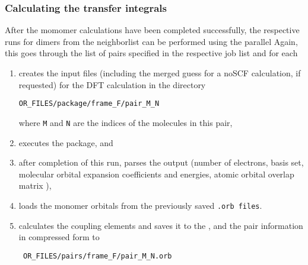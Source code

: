 \subsubsection{Calculating the transfer integrals}
After the momomer calculations have been completed successfully, the respective runs for dimers from the neighborlist can be performed using the parallel  \calculator
\label{sec:edft}
\vskip 0.1cm
{\small \ctpparallel \opt \xmloptions \sql \sqlstate \exe {} }
\vskip 0.1cm
Again, this \calc goes through the list of pairs specified in the respective job list and for each 
\begin{enumerate}
 \item creates the input files (including the merged guess for a noSCF calculation, if requested) for the DFT calculation in the directory 
\begin{verbatim}
OR_FILES/package/frame_F/pair_M_N
\end{verbatim}
where {\tt M} and {\tt N} are the indices of the molecules in this pair,
\item executes the package, and
\item after completion of this run, parses the output (number of electrons, basis set, molecular orbital expansion coefficients and energies, atomic orbital overlap matrix ),
\item loads the monomer orbitals from the previously saved {\tt *.orb files}.
\item calculates the coupling elements and saves it to the \sqlstate, and the pair information in compressed form to 
\begin{verbatim}
 OR_FILES/pairs/frame_F/pair_M_N.orb 
\end{verbatim}
\end{enumerate}



